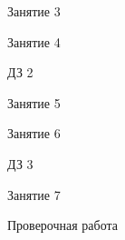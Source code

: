 \begin{class}[number=3]
	\begin{listofex}
		\item Занятие 3
	\end{listofex}
\end{class}

\begin{class}[number=4]
	\begin{listofex}
		\item Занятие 4
	\end{listofex}
\end{class}

\begin{homework}[number=2]
	\begin{listofex}
		\item ДЗ 2
	\end{listofex}
\end{homework}

\begin{class}[number=5]
	\begin{listofex}
		\item Занятие 5
	\end{listofex}
\end{class}

\begin{class}[number=6]
	\begin{listofex}
		\item Занятие 6
	\end{listofex}
\end{class}

\begin{homework}[number=3]
	\begin{listofex}
		\item ДЗ 3
	\end{listofex}
\end{homework}

\begin{class}[number=7]
	\begin{listofex}
		\item Занятие 7
	\end{listofex}
\end{class}

\begin{exam}
	\begin{listofex}
		\item Проверочная работа
	\end{listofex}
\end{exam}
